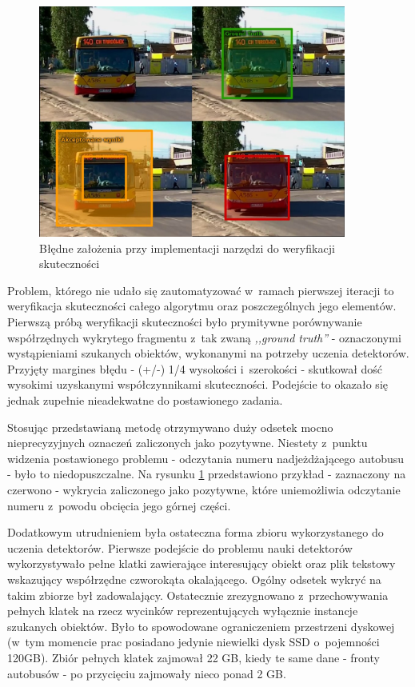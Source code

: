 \begin{figure}[h!]
	\centering
	\includegraphics[width=0.9\textwidth]{img/env_benchmark_fail_1}
	\caption{Błędne założenia przy implementacji narzędzi do
		weryfikacji skuteczności}
	\label{fig:autoverificationfail}
\end{figure}

Problem, którego nie udało się zautomatyzować 
w~ramach pierwszej iteracji to weryfikacja skuteczności
całego algorytmu oraz poszczególnych jego elementów. Pierwszą
próbą weryfikacji skuteczności było prymitywne porównywanie współrzędnych
wykrytego fragmentu z~tak zwaną \textit{,,ground truth''} - oznaczonymi
wystąpieniami szukanych obiektów, wykonanymi na potrzeby uczenia 
detektorów. 
Przyjęty margines błędu - (+/-) 1/4 wysokości i~szerokości - skutkował dość
wysokimi uzyskanymi współczynnikami skuteczności. Podejście to okazało
się jednak zupełnie nieadekwatne do postawionego zadania.

Stosując przedstawianą metodę otrzymywano 
duży odsetek mocno nieprecyzyjnych oznaczeń
zaliczonych jako pozytywne. Niestety
z~punktu widzenia postawionego problemu -
odczytania numeru nadjeżdżającego autobusu - 
było to niedopuszczalne. Na rysunku 
\ref{fig:autoverificationfail} przedstawiono przykład - 
zaznaczony na czerwono - wykrycia zaliczonego
jako pozytywne, które uniemożliwia odczytanie numeru z~powodu obcięcia
jego górnej części.

Dodatkowym utrudnieniem była ostateczna forma zbioru wykorzystanego 
do uczenia detektorów. Pierwsze podejście do problemu nauki 
detektorów wykorzystywało pełne klatki zawierające interesujący obiekt
oraz plik tekstowy wskazujący współrzędne czworokąta okalającego.
Ogólny odsetek wykryć na takim zbiorze był zadowalający. 
Ostatecznie zrezygnowano z~przechowywania pełnych klatek na rzecz
wycinków reprezentujących wyłącznie instancje szukanych obiektów.
Było to spowodowane ograniczeniem przestrzeni dyskowej (w~tym momencie
prac posiadano jedynie niewielki dysk SSD o~pojemności 120GB). Zbiór pełnych
klatek zajmował 22 GB, kiedy te same dane - fronty autobusów - po
przycięciu zajmowały nieco ponad 2 GB.

